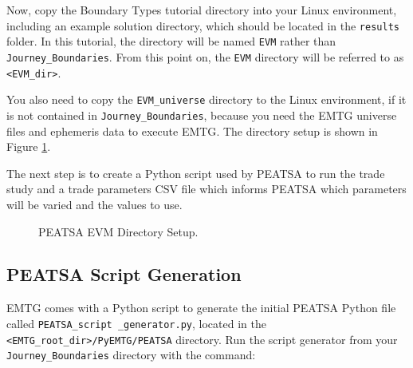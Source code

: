 \documentclass[11pt]{article}
\begin{document}
\noindent Now, copy the Boundary Types tutorial directory into your Linux environment, including an example solution directory, which should be located in the \texttt{results} folder. In this tutorial, the directory will be named \texttt{EVM} rather than \texttt{Journey\_Boundaries}. From this point on, the \texttt{EVM} directory will be referred to as \texttt{<EVM\_dir>}.

\noindent You also need to copy the \texttt{EVM\_universe} directory to the Linux environment, if it is not contained in \texttt{Journey\_Boundaries}, because you need the \ac{EMTG} universe files and ephemeris data to execute \ac{EMTG}. The directory setup is shown in Figure \ref{fig:evm_directory_setup}.

\noindent The next step is to create a Python script used by \ac{PEATSA} to run the trade study and a trade parameters CSV file which informs \ac{PEATSA} which parameters will be varied and the values to use.

\begin{figure}[H]
	\centering
	\caption{\label{fig:evm_directory_setup}\ac{PEATSA} EVM Directory Setup.}
\end{figure}

\subsection{PEATSA Script Generation}
\label{sec:peatsa_script_generation}

\ac{EMTG} comes with a Python script to generate the initial \ac{PEATSA} Python file called \texttt{PEATSA\_script \_generator.py}, located in the \texttt{<EMTG\_root\_dir>/PyEMTG/PEATSA} directory. Run the script generator from your \texttt{Journey\_Boundaries} directory with the command:
\end{document}
